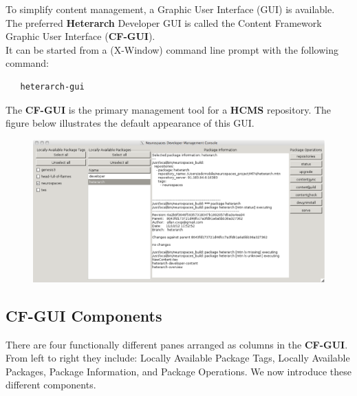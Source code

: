\documentclass[12pt]{article}
\begin{document}
To simplify content management, a Graphic User Interface (GUI) is available.\\
The preferred {\bf \small Heterarch} Developer GUI is called the Content Framework Graphic User Interface ({\small \bf CF-GUI}).\\
\noindent It can be started from a (X-Window) command line prompt with the following command:

\begin{verbatim}
   heterarch-gui
\end{verbatim}

\noindent The {\small \bf CF-GUI} is the primary management tool for a {\bf \small HCMS} repository. The figure below illustrates the default appearance of this GUI.

\begin{figure}[h]
   \centering
   \includegraphics[scale=0.4]{figures/heterarch-developer-content-gui.eps}
\end{figure}

\subsection*{CF-GUI Components}

There are four functionally different panes arranged as columns in the {\small \bf CF-GUI}. From left to right they include: Locally Available Package Tags, Locally Available Packages, Package Information, and Package Operations.
We now introduce these different components.
\end{document}
